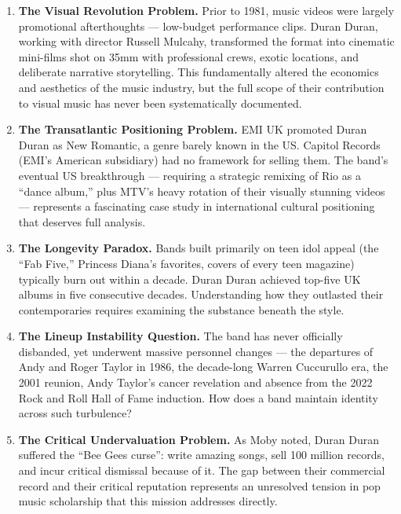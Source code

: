 \documentclass[11pt,letterpaper]{article}
\begin{document}
\begin{enumerate}
  \item \textbf{The Visual Revolution Problem.} Prior to 1981, music videos were largely promotional afterthoughts --- low-budget performance clips. Duran Duran, working with director Russell Mulcahy, transformed the format into cinematic mini-films shot on 35mm with professional crews, exotic locations, and deliberate narrative storytelling. This fundamentally altered the economics and aesthetics of the music industry, but the full scope of their contribution to visual music has never been systematically documented.

  \item \textbf{The Transatlantic Positioning Problem.} EMI UK promoted Duran Duran as New Romantic, a genre barely known in the US. Capitol Records (EMI's American subsidiary) had no framework for selling them. The band's eventual US breakthrough --- requiring a strategic remixing of Rio as a ``dance album,'' plus MTV's heavy rotation of their visually stunning videos --- represents a fascinating case study in international cultural positioning that deserves full analysis.

  \item \textbf{The Longevity Paradox.} Bands built primarily on teen idol appeal (the ``Fab Five,'' Princess Diana's favorites, covers of every teen magazine) typically burn out within a decade. Duran Duran achieved top-five UK albums in five consecutive decades. Understanding how they outlasted their contemporaries requires examining the substance beneath the style.

  \item \textbf{The Lineup Instability Question.} The band has never officially disbanded, yet underwent massive personnel changes --- the departures of Andy and Roger Taylor in 1986, the decade-long Warren Cuccurullo era, the 2001 reunion, Andy Taylor's cancer revelation and absence from the 2022 Rock and Roll Hall of Fame induction. How does a band maintain identity across such turbulence?

  \item \textbf{The Critical Undervaluation Problem.} As Moby noted, Duran Duran suffered the ``Bee Gees curse'': write amazing songs, sell 100 million records, and incur critical dismissal because of it. The gap between their commercial record and their critical reputation represents an unresolved tension in pop music scholarship that this mission addresses directly.
\end{enumerate}
\end{document}
